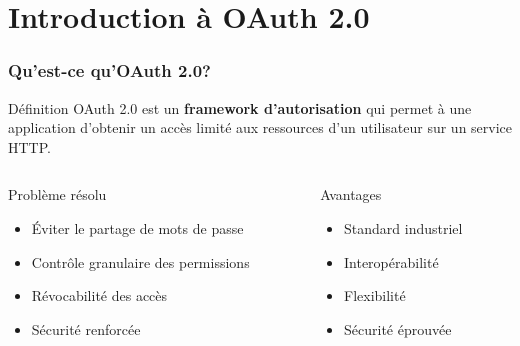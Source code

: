 \documentclass[aspectratio=169]{beamer}
\begin{document}
\section{Introduction à OAuth 2.0}

\begin{frame}
    \frametitle{\faShieldAlt \quad Qu'est-ce qu'OAuth 2.0?}
    \begin{alertblock}{Définition}
        \Large OAuth 2.0 est un \textbf{framework d'autorisation} qui permet à une application d'obtenir un accès limité aux ressources d'un utilisateur sur un service HTTP.
    \end{alertblock}
    
    \vspace{0.5cm}
    \begin{columns}
        \begin{column}{0.5\textwidth}
            \begin{block}{\faExclamationTriangle \quad Problème résolu}
                \begin{itemize}
                    \item \textcolor{errorred}{Éviter le partage de mots de passe}
                    \item \textcolor{primaryblue}{Contrôle granulaire des permissions}
                    \item \textcolor{warningorange}{Révocabilité des accès}
                    \item \textcolor{accentgreen}{Sécurité renforcée}
                \end{itemize}
            \end{block}
        \end{column}
        \begin{column}{0.5\textwidth}
            \begin{block}{\faCheckCircle \quad Avantages}
                \begin{itemize}
                    \item \textcolor{accentgreen}{Standard industriel}
                    \item \textcolor{primaryblue}{Interopérabilité}
                    \item \textcolor{warningorange}{Flexibilité}
                    \item \textcolor{accentgreen}{Sécurité éprouvée}
                \end{itemize}
            \end{block}
        \end{column}
    \end{columns}
\end{frame}
\end{document}
